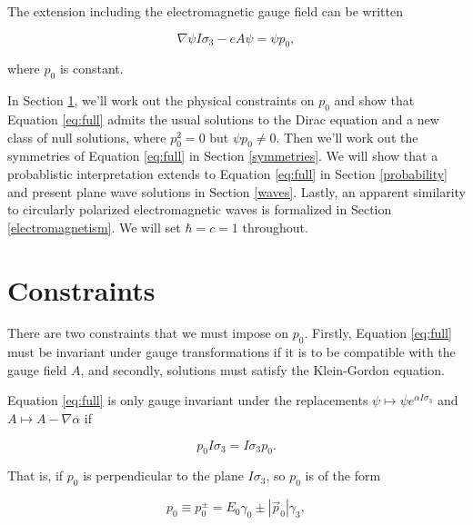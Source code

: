 \documentclass[twocolumn]{article}
\begin{document}
  The extension including the electromagnetic gauge field can be written

  \begin{equation}
    \nabla \psi I \sigma_3 - e A \psi = \psi p_0, \label{eq:full}
  \end{equation}

  where $p_0$ is constant.

  In Section \ref{constraints}, we'll work out the physical constraints on $p_0$ and show that Equation \ref{eq:full} admits the usual solutions to the Dirac equation and a new class of null solutions, where $p_0^2 = 0$ but $\psi p_0 \not = 0$. Then we'll work out the symmetries of Equation \ref{eq:full} in Section \ref{symmetries}. We will show that a probablistic interpretation extends to Equation \ref{eq:full} in Section \ref{probability} and present plane wave solutions in Section \ref{waves}. Lastly, an apparent similarity to circularly polarized electromagnetic waves is formalized in Section \ref{electromagnetism}. We will set $\hbar = c = 1$ throughout.


  \section{Constraints}\label{constraints}

  There are two constraints that we must impose on $p_0$. Firstly, Equation \ref{eq:full} must be invariant under gauge transformations if it is to be compatible with the gauge field $A$, and secondly, solutions must satisfy the Klein-Gordon equation.

  Equation \ref{eq:full} is only gauge invariant under the replacements $\psi \mapsto \psi e^{\alpha I \sigma_3}$ and $A \mapsto A - \nabla \alpha$ if 

  \begin{equation}
    p_0 I\sigma_3 = I \sigma_3 p_0. \label{momentum-perp-spin}
  \end{equation} 

  That is, if $p_0$ is perpendicular to the plane $I \sigma_3$, so $p_0$ is of the form

  \begin{equation}
    p_0 \equiv p_0^\pm = E_0 \gamma_0 \pm |\vec p_0| \gamma_3,\label{eq:p_0}
  \end{equation} 
\end{document}

